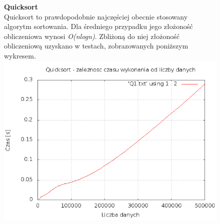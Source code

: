 \documentclass[a4paper,11pt]{report}
\begin{document}
\begin{figure}
  \begin{center}
  \textbf{Quicksort}
\\Quicksort to prawdopodobnie najczęściej obecnie stosowany algorytm sortowania. Dla średniego przypadku jego złożoność obliczeniowa wynosi \emph{O(nlogn)}. Zbliżoną do niej złożoność obliczeniową uzyskano w testach, zobrazowanych poniższym wykresem.
\\
\includegraphics[scale=0.5]{./quick1.png}
  \end{center}
\end{figure}
\end{document}
